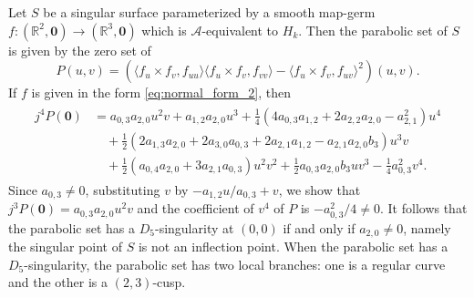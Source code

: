 \documentclass[12pt]{amsart}
\theoremstyle{plain}
\theoremstyle{definition}
\newcommand{\R}{\mathbb{R}}
\begin{document}
Let $S$ be a singular surface parameterized by a smooth map-germ $f\colon(\R^2,\bm{0})\to(\R^3,\bm{0})$ which is $\mathcal{A}$-equivalent to $H_k$. 
Then the parabolic set of $S$ is given by the zero set of 
\[
P(u,v) = (\langle f_u \times f_v, f_{u u} \rangle\langle f_u \times f_v, f_{v v} \rangle - \langle f_u \times f_v, f_{u v} \rangle^2)(u,v).
\]
If $f$ is given in the form \eqref{eq:normal_form_2}, then
\begin{align*}
\begin{split}
j^4 P(\bm{0}) & =  a_{0,3}a_{2,0}u^2 v + a_{1,2}a_{2,0}u^3 + \frac14(4a_{0,3}a_{1,2} + 2a_{2,2}a_{2,0} - a_{2,1}^2)u^4\\
& \quad + \frac12(2a_{1,3}a_{2,0} + 2a_{3,0}a_{0,3} + 2a_{2,1}a_{1,2} - a_{2,1}a_{2,0}b_3)u^3 v\\
& \quad + \frac12(a_{0,4}a_{2,0} + 3a_{2,1}a_{0,3})u^2 v^2 + \frac12a_{0,3}a_{2,0}b_3 u v^3 - \frac14a_{0,3}^2 v^4.
\end{split}
\end{align*}
Since $a_{0,3} \ne 0$, substituting $v$ by $- a_{1,2}u/a_{0,3} + v$, we show that  $j^3 P(\bm{0}) = a_{0,3}a_{2,0}u^2 v$ and the coefficient of $v^4$ of $P$ is $-a_{0,3}^2/4\ne0$. 
It follows that the parabolic set has a $D_5$-singularity at $(0,0)$ if and only if $a_{2,0} \ne0$, namely the singular point of $S$ is not an inflection point. 
When the parabolic set has a $D_5$-singularity, the parabolic set has two local branches: one is a regular curve and the other is a $(2,3)$-cusp.
\end{document}
